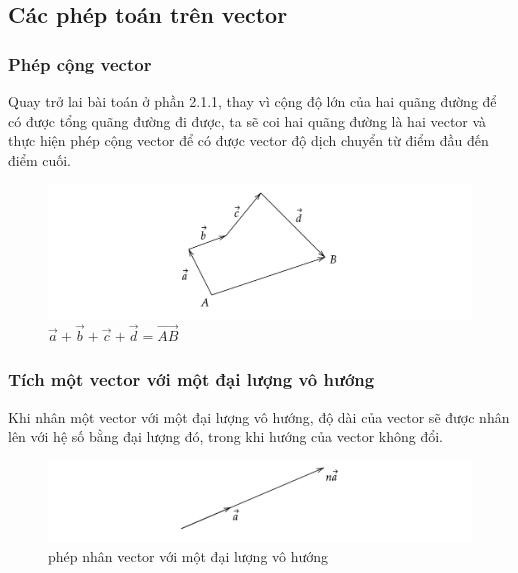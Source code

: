 \subsection{Các phép toán trên vector}

\subsubsection{Phép cộng vector}
Quay trở lai bài toán ở phần 2.1.1, thay vì cộng độ lớn của hai quãng đường để có được tổng quãng đường đi được, ta sẽ coi hai quãng đường là hai vector và thực hiện phép cộng vector để có được vector độ dịch chuyển từ điểm đầu đến điểm cuối.
\begin{figure}[H]
    \centering
    \includegraphics[width=1\textwidth]{Tuan2/Figures/congvector.png}
    \caption{$\overrightarrow{a}+\overrightarrow{b}+\overrightarrow{c}+\overrightarrow{d}=\overrightarrow{AB}$}
\end{figure}

\subsubsection{Tích một vector với một đại lượng vô hướng}
Khi nhân một vector với một đại lượng vô hướng, độ dài của vector sẽ được nhân lên với hệ số bằng đại lượng đó, trong khi hướng của vector không đổi.
\begin{figure}[H]
    \centering
    \includegraphics[width=1\textwidth]{Tuan2/Figures/vector x vo huong.png}
    \caption{phép nhân vector với một đại lượng vô hướng}
\end{figure}

